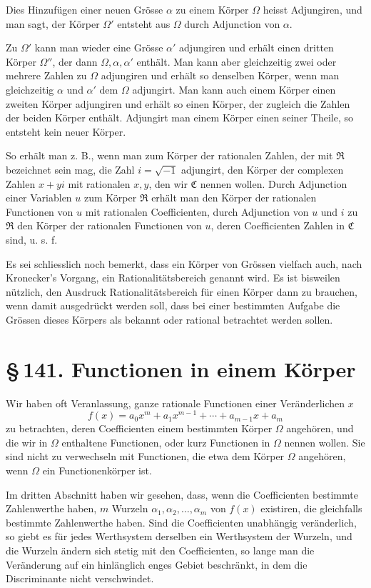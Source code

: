 \documentclass[11pt]{article}
\providecommand{\sect}[2]{\section*{\S\,#1. #2}}
\begin{document}
Dies Hinzufügen einer neuen Grösse $\alpha$ zu einem Körper $\Omega$ heisst Adjungiren, und man sagt, der Körper $\Omega'$ entsteht aus $\Omega$ durch Adjunction von $\alpha$.

Zu $\Omega'$ kann man wieder eine Grösse $\alpha'$ adjungiren und erhält einen dritten Körper $\Omega''$, der dann $\Omega,\alpha,\alpha'$ enthält. Man kann aber gleichzeitig zwei oder mehrere Zahlen zu $\Omega$ adjungiren und erhält so denselben Körper, wenn man gleichzeitig $\alpha$ und $\alpha'$ dem $\Omega$ adjungirt. Man kann auch einem Körper einen zweiten Körper adjungiren und erhält so einen Körper, der zugleich die Zahlen der beiden Körper enthält. Adjungirt man einem Körper einen seiner Theile, so entsteht kein neuer Körper.

So erhält man z. B., wenn man zum Körper der rationalen Zahlen, der mit $\mathfrak R$ bezeichnet sein mag, die Zahl $i=\sqrt{-1}$ adjungirt, den Körper der complexen Zahlen $x+yi$ mit rationalen $x,y$, den wir $\mathfrak C$ nennen wollen. Durch Adjunction einer Variablen $u$ zum Körper $\mathfrak R$ erhält man den Körper der rationalen Functionen von $u$ mit rationalen Coefficienten, durch Adjunction von $u$ und $i$ zu $\mathfrak R$ den Körper der rationalen Functionen von $u$, deren Coefficienten Zahlen in $\mathfrak C$ sind, u. s. f.

Es sei schliesslich noch bemerkt, dass ein Körper von Grössen vielfach auch, nach Kronecker's Vorgang, ein Rationalitätsbereich genannt wird. Es ist bisweilen nützlich, den Ausdruck Rationalitätsbereich für einen Körper dann zu brauchen, wenn damit ausgedrückt werden soll, dass bei einer bestimmten Aufgabe die Grössen dieses Körpers als bekannt oder rational betrachtet werden sollen.

\sect{141}{Functionen in einem Körper}

Wir haben oft Veranlassung, ganze rationale Functionen einer Veränderlichen $x$
\[
\tag{1}
        f(x)=a_0x^m+a_1x^{m-1}+\cdots+a_{m-1}x+a_m
\]
zu betrachten, deren Coefficienten einem bestimmten Körper $\Omega$ angehören, und die wir in $\Omega$ enthaltene Functionen, oder kurz Functionen in $\Omega$ nennen wollen. Sie sind nicht zu verwechseln mit Functionen, die etwa dem Körper $\Omega$ angehören, wenn $\Omega$ ein Functionenkörper ist.

Im dritten Abschnitt haben wir gesehen, dass, wenn die Coefficienten bestimmte Zahlenwerthe haben, $m$ Wurzeln $\alpha_1,\alpha_2,\ldots,\alpha_m$ von $f(x)$ existiren, die gleichfalls bestimmte Zahlenwerthe haben. Sind die Coefficienten unabhängig veränderlich, so giebt es für jedes Werthsystem derselben ein Werthsystem der Wurzeln, und die Wurzeln ändern sich stetig mit den Coefficienten, so lange man die Veränderung auf ein hinlänglich enges Gebiet beschränkt, in dem die Discriminante nicht verschwindet.
\end{document}
